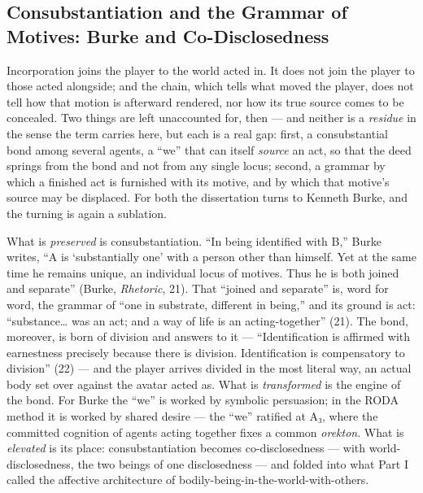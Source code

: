 \documentclass{article}
\begin{document}
\subsection*{Consubstantiation and the Grammar of Motives: Burke and Co-Disclosedness}

Incorporation joins the player to the world acted in. It does not join the player to those acted alongside; and the chain, which tells what moved the player, does not tell how that motion is afterward rendered, nor how its true source comes to be concealed. Two things are left unaccounted for, then — and neither is a \textit{residue} in the sense the term carries here, but each is a real gap: first, a consubstantial bond among several agents, a ``we'' that can itself \textit{source} an act, so that the deed springs from the bond and not from any single locus; second, a grammar by which a finished act is furnished with its motive, and by which that motive's source may be displaced. For both the dissertation turns to Kenneth Burke, and the turning is again a sublation.

What is \textit{preserved} is consubstantiation. ``In being identified with B,'' Burke writes, ``A is `substantially one' with a person other than himself. Yet at the same time he remains unique, an individual locus of motives. Thus he is both joined and separate'' (Burke, \textit{Rhetoric}, 21). That ``joined and separate'' is, word for word, the grammar of ``one in substrate, different in being,'' and its ground is act: ``substance… was an act; and a way of life is an acting-together'' (21). The bond, moreover, is born of division and answers to it — ``Identification is affirmed with earnestness precisely because there is division. Identification is compensatory to division'' (22) — and the player arrives divided in the most literal way, an actual body set over against the avatar acted as. What is \textit{transformed} is the engine of the bond. For Burke the ``we'' is worked by symbolic persuasion; in the RODA method it is worked by shared desire — the ``we'' ratified at A₃, where the committed cognition of agents acting together fixes a common \textit{orekton}. What is \textit{elevated} is its place: consubstantiation becomes co-disclosedness — with world-disclosedness, the two beings of one disclosedness — and folded into what Part I called the affective architecture of bodily-being-in-the-world-with-others.
\end{document}
